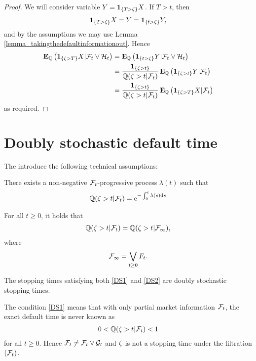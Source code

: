 \begin{proof}
We will consider variable $Y = \boldsymbol{1}_{ \{T> \zeta \} } X$. If $T > t$, then
	\begin{align}
		\boldsymbol{1}_{ \{T> \zeta \} } X = Y = \boldsymbol{1}_{ \{t> \zeta \} } Y,
	\end{align}
and by the assumptions we may use Lemma \ref{lemma_takingthedefaultinformationout}. Hence
	\begin{align}
		\operatorname{\boldsymbol{\mathrm{E}}}_{\mathbb{Q}} \left( \boldsymbol{1}_{ \{ \zeta > T \} } X | \mathcal{F}_t \vee \mathcal{H}_t \right) 
		&= \operatorname{\boldsymbol{\mathrm{E}}}_{\mathbb{Q}} \left( \boldsymbol{1}_{ \{t> \zeta \} } Y  | \mathcal{F}_t \vee \mathcal{H}_t \right) \\
		&= \frac{\boldsymbol{1}_{ \{ \zeta > t \} }}{\mathbb{Q} (\zeta > t | \mathcal{F}_t )} \operatorname{\boldsymbol{\mathrm{E}}}_{\mathbb{Q}}  \left( \boldsymbol{1}_{ \{ \zeta > t \} } Y | \mathcal{F}_t \right) \\
		&= \frac{\boldsymbol{1}_{ \{ \zeta > t \} }}{\mathbb{Q} (\zeta > t | \mathcal{F}_t )} \operatorname{\boldsymbol{\mathrm{E}}}_{\mathbb{Q}}  \left( \boldsymbol{1}_{ \{ \zeta > T \} } X | \mathcal{F}_t \right)
	\end{align}
as required.
\end{proof}

\section{Doubly stochastic default time}
\label{sec:doublystochastic}

The introduce the following technical assumptions:
\begin{DS}
	\item\label{DS1} There exists a non-negative $\mathcal{F}_t$-progressive process $\lambda (t)$ such that 
	\begin{align}
	\mathbb{Q} (\zeta > t | \mathcal{F}_t ) = \mathrm{e}^{ - \int_0^t \lambda(s) \mathrm{d} s }
	\end{align}
	\item\label{DS2} For all $t \geq 0$, it holds that 
	\begin{align}
	\mathbb{Q} (\zeta > t | \mathcal{F}_t ) = \mathbb{Q} (\zeta > t | \mathcal{F}_{\infty} ),
	\end{align}
	where
	\begin{align}
	\mathcal{F}_{\infty} = \bigvee_{t \geq 0} F_t .
	\end{align}
\end{DS}
The stopping times satisfying both \ref{DS1} and \ref{DS2} are doubly stochastic stopping times.

The condition \ref{DS1} means that with only partial market information $\mathcal{F}_t$, the exact default time is never known as
\begin{align}
0 < \mathbb{Q} (\zeta > t | \mathcal{F}_t ) < 1
\end{align}
for all $t \geq 0$. Hence $\mathcal{F}_t \not = \mathcal{F}_t \vee \mathcal{G}_t$ and $\zeta$ is not a stopping time under the filtration $(\mathcal{F}_t)$.

